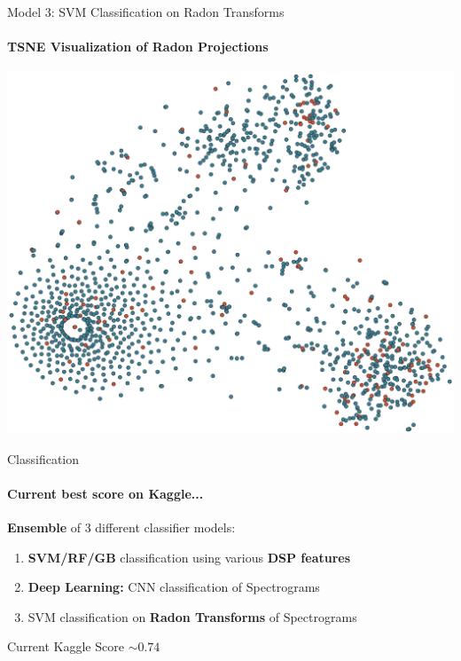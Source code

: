 \documentclass{beamer}
\begin{document}
\begin{frame}{Model 3: SVM Classification on Radon Transforms}
  \framesubtitle{TSNE Visualization of Radon Projections}

  \begin{center}
    \vspace*{-0.15cm}
  \includegraphics[scale=0.4]{img/tsne_Radon.eps}
  \end{center}

\end{frame}


\begin{frame}{Classification}
  \framesubtitle{Current best score on Kaggle...}

  \textbf{Ensemble} of 3 different classifier models:
  
  \begin{enumerate}
  \item \textbf{SVM/RF/GB} classification using various \textbf{DSP features}
  \item \textbf{Deep Learning:} CNN classification of Spectrograms
  \item SVM classification on \textbf{Radon Transforms} of Spectrograms
  \end{enumerate}

  \begin{block}{Current Kaggle Score}
    $\sim 0.74$
  \end{block}

\end{frame}
\end{document}
